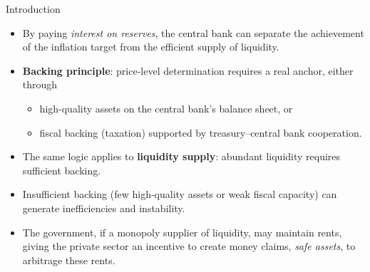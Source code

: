 \documentclass[11pt,aspectratio=169]{beamer}
\begin{document}
\begin{frame}{Introduction}
\small
\begin{itemize}

  \item By paying \emph{interest on reserves}, the central bank can separate the achievement of the inflation target from the efficient supply of  liquidity.

  \vspace{0.6em}

  \item \textbf{Backing principle}: price-level determination requires a real anchor, either through
  \begin{itemize}
    \item high-quality assets on the central bank’s balance sheet, or
    \item fiscal backing (taxation) supported by treasury--central bank cooperation.
  \end{itemize}

  \vspace{0.6em}

  \item The same logic applies to \textbf{liquidity supply}: abundant liquidity requires sufficient backing.

  \vspace{0.6em}

  \item Insufficient backing (few high-quality assets or weak fiscal capacity) can generate inefficiencies and instability.

  \vspace{0.6em}

  \item The government, if a monopoly supplier of liquidity, may maintain rents, giving the private sector an incentive to create money claims, \emph{safe assets}, to arbitrage these rents.

\end{itemize}
\end{frame}
\end{document}

